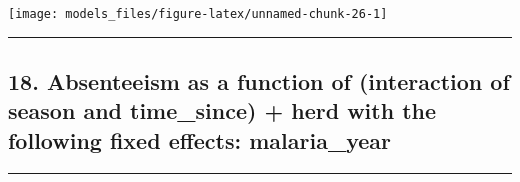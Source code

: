 \documentclass[]{article}
\begin{document}
\begin{center}\texttt{[image: models\_files/figure-latex/unnamed-chunk-26-1]} \end{center}

\newpage

\begin{center}\rule{0.5\linewidth}{\linethickness}\end{center}

\subsection{18. Absenteeism as a function of (interaction of season and
time\_since) + herd with the following fixed effects:
malaria\_year}\label{absenteeism-as-a-function-of-interaction-of-season-and-time_since-herd-with-the-following-fixed-effects-malaria_year}

\begin{center}\rule{0.5\linewidth}{\linethickness}\end{center}
\end{document}

